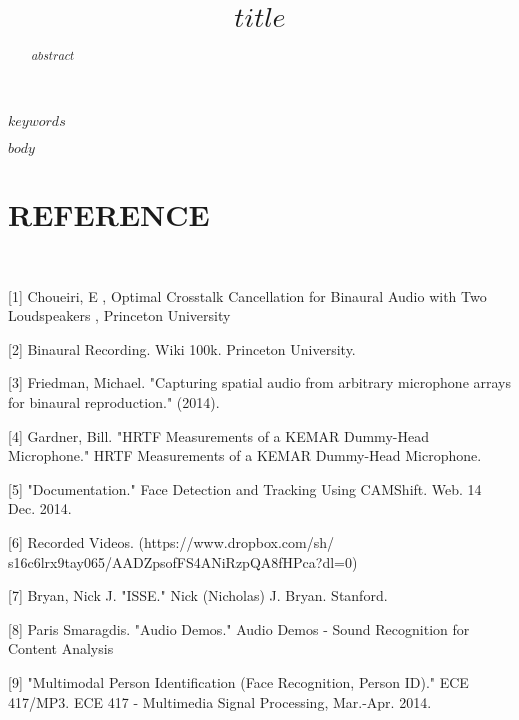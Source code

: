 \documentclass{article}
\begin{document}
\title{$title$}

\address{$university$\\$dept1$\\$dept2$\\$dept3$}
\maketitle

\begin{abstract}
  \boldmath
  $abstract$
\end{abstract}

\begin{keywords}
$keywords$
\end{keywords}

$body$

\newpage
\section{REFERENCE}
\

[1] Choueiri, E , Optimal Crosstalk Cancellation for Binaural Audio with Two Loudspeakers , Princeton University 

\centerline{}

[2] Binaural Recording. Wiki 100k. Princeton University.

\centerline{}

[3] Friedman, Michael. "Capturing spatial audio from arbitrary microphone arrays for binaural reproduction." (2014).

\centerline{}

[4] Gardner, Bill. "HRTF Measurements of a KEMAR Dummy-Head Microphone." HRTF Measurements of a KEMAR Dummy-Head Microphone. 

\centerline{}

[5] "Documentation." Face Detection and Tracking Using CAMShift. Web. 14 Dec. 2014. 

\centerline{}

[6] Recorded Videos. (https://www.dropbox.com/sh/
s16c6lrx9tay065/AADZpsofFS4ANiRzpQA8fHPca?dl=0)

\centerline{}

[7] Bryan, Nick J. "ISSE." Nick (Nicholas) J. Bryan. Stanford.

\centerline{}

[8] Paris Smaragdis. "Audio Demos." Audio Demos - Sound Recognition for Content Analysis

\centerline{}

[9] "Multimodal Person Identification (Face Recognition, Person ID)." ECE 417/MP3. ECE 417 - Multimedia Signal Processing, Mar.-Apr. 2014.
\end{document}
